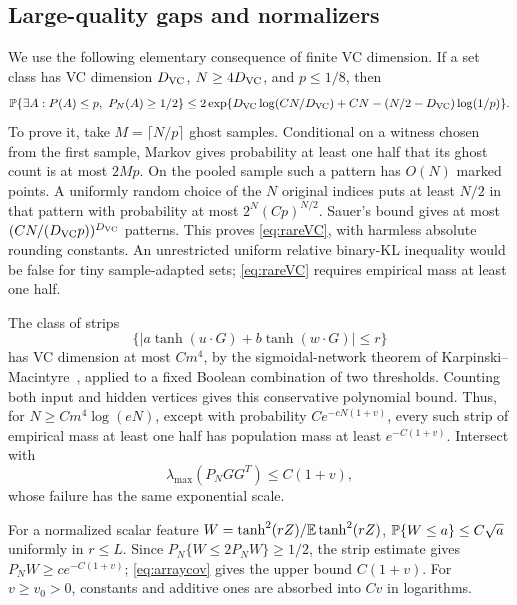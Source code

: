 \documentclass[11pt]{article}
\begin{document}
\subsection{Large-quality gaps and normalizers}
We use the following elementary consequence of finite VC dimension. If a set class has VC dimension $D_{\rm VC}$, $N\ge4D_{\rm VC}$, and $p\le1/8$, then
\begin{equation}\label{eq:rareVC}
 \mathbb P\{\exists A: P(A)\le p,\ P_N(A)\ge1/2\}
 \le2\exp\{D_{\rm VC}\log(CN/D_{\rm VC})+CN
                 -(N/2-D_{\rm VC})\log(1/p)\}.
\end{equation}
To prove it, take $M=\lceil N/p\rceil$ ghost samples. Conditional on a witness chosen from the first sample, Markov gives probability at least one half that its ghost count is at most $2Mp$. On the pooled sample such a pattern has $O(N)$ marked points. A uniformly random choice of the $N$ original indices puts at least $N/2$ in that pattern with probability at most $2^N(Cp)^{N/2}$. Sauer's bound gives at most $(C N/(D_{\rm VC}p))^{D_{\rm VC}}$ patterns. This proves \eqref{eq:rareVC}, with harmless absolute rounding constants. An unrestricted uniform relative binary-KL inequality would be false for tiny sample-adapted sets; \eqref{eq:rareVC} requires empirical mass at least one half.

The class of strips
\[
 \{|a\tanh(u\cdot G)+b\tanh(w\cdot G)|\le r\}
\]
has VC dimension at most $Cm^4$, by the sigmoidal-network theorem of Karpinski--Macintyre~\cite{km}, applied to a fixed Boolean combination of two thresholds. Counting both input and hidden vertices gives this conservative polynomial bound. Thus, for $N\ge Cm^4\log(eN)$, except with probability $Ce^{-cN(1+v)}$, every such strip of empirical mass at least one half has population mass at least $e^{-C(1+v)}$. Intersect with
\begin{equation}\label{eq:arraycov}
 \lambda_{\max}(P_NGG^T)\le C(1+v),
\end{equation}
whose failure has the same exponential scale.

For a normalized scalar feature $W=\tanh^2(rZ)/\mathbb E\tanh^2(rZ)$, $\mathbb P\{W\le a\}\le C\sqrt a$ uniformly in $r\le L$. Since $P_N\{W\le2P_NW\}\ge1/2$, the strip estimate gives $P_NW\ge c e^{-C(1+v)}$; \eqref{eq:arraycov} gives the upper bound $C(1+v)$. For $v\ge v_0>0$, constants and additive ones are absorbed into $Cv$ in logarithms.
\end{document}
